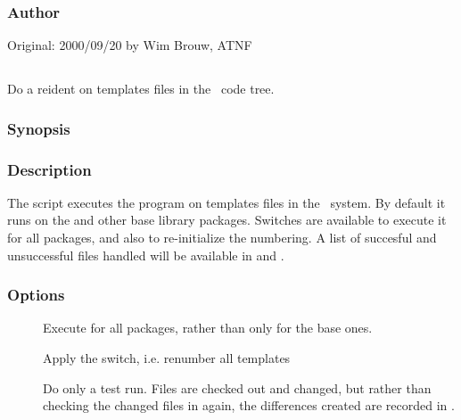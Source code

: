 \subsubsection*{Author}

Original: 2000/09/20 by Wim Brouw, ATNF


\newpage

\subsection{}
\label{UPreident}

Do a reident on templates files in the \aipspp\ code tree.

\subsubsection*{Synopsis}

\begin{synopsis}
\end{synopsis}

\subsubsection*{Description}

\noindent
The  script executes the  program on templates
files in the \aipspp\ system. By default it runs on the 
and other base library packages. Switches are available to execute
it for all packages,
and also to re-initialize the numbering. A list of succesful and unsuccessful
files handled will be available in  and .

\subsubsection*{Options}

\begin{description}
\item[]
    Execute for all packages, rather than only for the  base ones.
\item[]
    Apply the  switch, i.e. renumber all templates
\item[]
    Do only a test run. Files are checked out and changed, but rather than
    checking the changed files in again, the differences created are recorded
    in .
\end{description}

